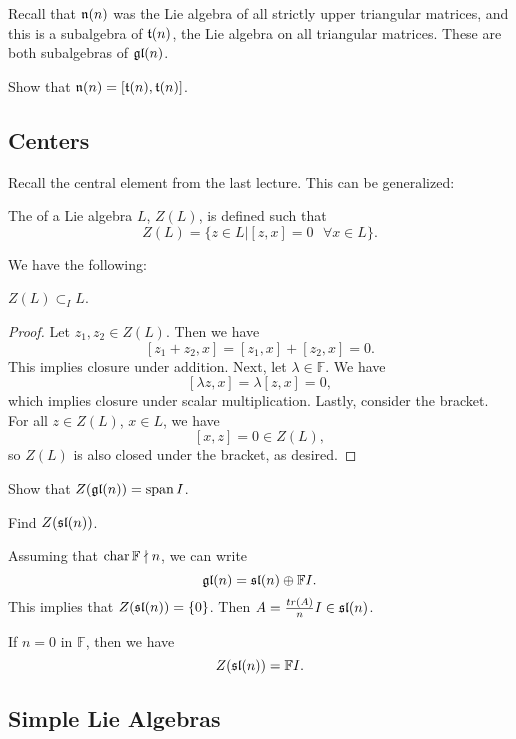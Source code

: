 Recall that $\frak{n}(n)$ was the Lie algebra of all strictly upper triangular matrices, and this is a subalgebra of $\frak{t}(n)$, the Lie algebra on all triangular matrices. These are both subalgebras of $\frak{gl}(n)$. 

\begin{exercise}
Show that $\frak{n}(n) = [\frak{t}(n), \frak{t}(n)]$.
\end{exercise}

\subsection{Centers}
Recall the central element from the last lecture. This can be generalized:
\begin{definition}
The  of a Lie algebra $L$, $Z(L)$, is defined such that 
\[ Z(L) = \{ z \in L | [z,x] = 0 \text{ } \forall x \in L \}. \] 
\end{definition}

We have the following: 
\begin{lemma*}
$Z(L) \subset_I L$.
\end{lemma*}
\begin{proof}
Let $z_1,z_2 \in Z(L)$. Then we have 
\[ [z_1 + z_2, x] = [z_1,x] + [z_2,x] = 0. \] This implies closure under addition. 
Next, let $\lambda \in \mathbb{F}$. We have 
\[ [\lambda z, x] = \lambda[z,x] = 0, \] which implies closure under scalar multiplication. Lastly, consider the bracket. For all $z \in Z(L)$, $x \in L$, we have 
\[ [x,z] = 0 \in Z(L), \] so $Z(L)$ is also closed under the bracket, as desired. 
\end{proof}

\begin{exercise}
Show that $Z(\frak{gl}(n)) = \operatorname{span}{I}$. 
\end{exercise}

\begin{example}
Find $Z(\frak{sl}(n))$. 
\end{example}
\begin{soln}
Assuming that $\operatorname{char} \mathbb{F} \nmid n$, we can write 
\[ \frak{gl}(n) = \frak{sl}(n) \oplus \mathbb{F} I. \] This implies that $Z(\frak{sl}(n)) = \{0\}$. Then $A = \frac{tr(A)}{n}I \in \frak{sl}(n)$. 

If $n = 0$ in $\mathbb{F}$, then we have 
\[ Z(\frak{sl}(n)) = \mathbb{F} I. \]
\end{soln}

\subsection{Simple Lie Algebras}

